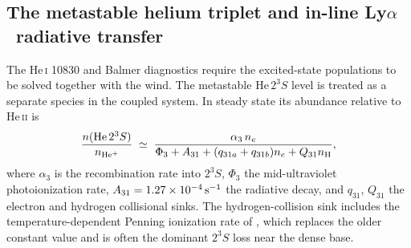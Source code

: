 \documentclass[twocolumn]{aastex702}
\newcommand{\HeTS}{\mathrm{He}\,2^{3}S}
\newcommand{\Lya}{\mbox{Ly}\ensuremath{\alpha}}
\begin{document}
\subsection{The metastable helium triplet and in-line \Lya\ radiative transfer}
\label{sec:hets}

The \mbox{He\,\textsc{i}} 10830 and Balmer diagnostics require the excited-state
populations to be solved together with the wind. The metastable $\HeTS$ level is treated
as a separate species in the coupled system. In steady state its abundance relative to
\mbox{He\,\textsc{ii}} is
\begin{equation}
\frac{n(\HeTS)}{n_{\rm He^+}} \;\simeq\;
\frac{\alpha_3\,n_e}{\Phi_3 + A_{31} + (q_{31a}+q_{31b})n_e + Q_{31}n_{\rm H}},
\end{equation}
where $\alpha_3$ is the recombination rate into $2^3S$, $\Phi_3$ the mid-ultraviolet
photoionization rate, $A_{31}=1.27\times10^{-4}\,{\rm s}^{-1}$ the radiative decay, and
$q_{31}$, $Q_{31}$ the electron and hydrogen collisional sinks. The hydrogen-collision
sink includes the temperature-dependent Penning ionization rate of \citet{Taylor2025},
which replaces the older constant value and is often the dominant $2^3S$ loss near the
dense base.
\end{document}
